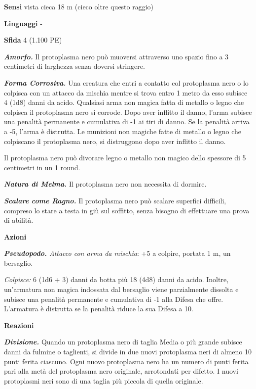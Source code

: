 \begin{multicols}{2}
\textbf{Sensi} vista cieca 18 m (cieco oltre questo raggio)

\textbf{Linguaggi} -

\textbf{Sfida} 4 (1.100 PE)

\emph{\textbf{Amorfo.}} Il protoplasma nero può muoversi attraverso uno spazio fino a 3 centimetri di larghezza senza doversi stringere.

\emph{\textbf{Forma Corrosiva.}} Una creatura che entri a contatto col protoplasma nero o lo colpisca con un attacco da mischia mentre si trova entro 1 metro da esso subisce 4 (1d8) danni da acido. Qualsiasi arma non magica fatta di metallo o legno che colpisca il protoplasma nero si corrode. Dopo aver inflitto il danno, l'arma subisce una penalità permanente e cumulativa di -1 ai tiri di danno. Se la penalità arriva a -5, l'arma è distrutta. Le munizioni non magiche fatte di metallo o legno che colpiscano il protoplasma nero, si distruggono dopo aver inflitto il danno.

Il protoplasma nero può divorare legno o metallo non magico dello spessore di 5 centimetri in un 1 round.

\emph{\textbf{Natura di Melma.}} Il protoplasma nero non necessita di dormire.

\emph{\textbf{Scalare come Ragno.}} Il protoplasma nero può scalare superfici difficili, compreso lo stare a testa in giù sul soffitto, senza bisogno di effettuare una prova di abilità.

\textbf{Azioni}

\emph{\textbf{Pseudopodo.} Attacco con arma da mischia}: +5 a colpire, portata 1 m, un bersaglio.

\emph{Colpisce:} 6 (1d6 + 3) danni da botta più 18 (4d8) danni da acido. Inoltre, un'armatura non magica indossata dal bersaglio viene parzialmente dissolta e subisce una penalità permanente e cumulativa di -1 alla Difesa che offre. L'armatura è distrutta se la penalità riduce la sua Difesa a 10.

\textbf{Reazioni}

\emph{\textbf{Divisione.}} Quando un protoplasma nero di taglia Media o più grande subisce danni da fulmine o taglienti, si divide in due nuovi protoplasma neri di almeno 10 punti ferita ciascuno. Ogni nuovo protoplasma nero ha un numero di punti ferita pari alla metà del protoplasma nero originale, arrotondati per difetto. I nuovi protoplasmi neri sono di una taglia più piccola di quella originale.


\end{multicols}
